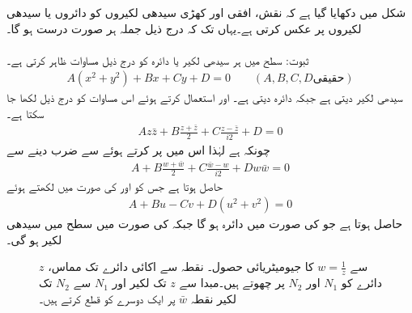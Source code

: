 شکل  میں دکھایا گیا ہے کہ  نقش،  افقی اور کھڑی سیدھی لکیروں کو دائروں یا سیدھی لکیروں پر عکس کرتی ہے۔یہاں تک کہ درج ذیل جملہ ہر صورت درست ہو گا۔\\
\\
ثبوت:  سطح میں ہر سیدھی لکیر یا دائرہ کو درج ذیل مساوات ظاہر کرتی ہے۔
\begin{align*}
A(x^2+y^2)+Bx+Cy+D=0\quad \quad (A,B,C,D \text{حقیقی})
\end{align*}
 سیدھی لکیر دیتی ہے جبکہ  دائرہ دیتی ہے۔  اور   استعمال کرتے ہوئے اس مساوات کو درج ذیل لکھا جا سکتا ہے۔
\begin{align*}
Az\bar{z}+B\frac{z+\bar{z}}{2}+C\frac{z-\bar{z}}{i2}+D=0
\end{align*}
چونکہ  ہے لہٰذا اس میں  پر کرتے ہوئے  سے ضرب دینے سے 
\begin{align*}
A+B\frac{w+\bar{w}}{2}+C\frac{\bar{w}-w}{i2}+Dw\bar{w}=0
\end{align*}
حاصل ہوتا ہے جس کو  اور  کی صورت میں لکھتے ہوئے
\begin{align*}
A+Bu-Cv+D(u^2+v^2)=0
\end{align*}
حاصل ہوتا ہے جو  کی صورت میں دائرہ ہو گا جبکہ  کی صورت میں  سطح میں سیدھی لکیر ہو گی۔ 
\begin{figure}
\centering
{}
\caption{$z$ سے $w=\tfrac{1}{z}$ کا جیومیٹریائی حصول۔ نقطہ  سے اکائی دائرے تک مماس،  دائرے کو $N_1$ اور $N_2$ پر چھوتے ہیں۔مبدا سے $z$ تک لکیر اور $N_1$ سے $N_2$ تک لکیر نقطہ $\bar{w}$ پر ایک دوسرے کو قطع کرتے ہیں۔ }
\label{شکل_نقش_اکائی_دائرے_میں_الٹ}
\end{figure}
%

